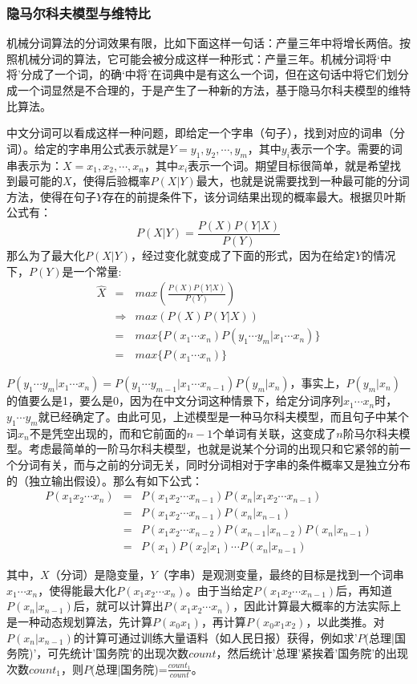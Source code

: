 \subsubsection{隐马尔科夫模型与维特比}
\par 机械分词算法的分词效果有限，比如下面这样一句话：产量三年中将增长两倍。按照机械分词的算法，它可能会被分成这样一种形式：产量\textbar 三年。机械分词将‘中将’分成了一个词，的确‘中将’在词典中是有这么一个词，但在这句话中将它们划分成一个词显然是不合理的，于是产生了一种新的方法，基于隐马尔科夫模型的维特比算法。
\par 中文分词可以看成这样一种问题，即给定一个字串（句子），找到对应的词串（分词）。给定的字串用公式表示就是$Y= y_1,y_2,\cdots,y_m$，其中$y_i$表示一个字。需要的词串表示为：$X=x_1,x_2,\cdots,x_n$，其中$x_i$表示一个词。期望目标很简单，就是希望找到最可能的$X$，使得后验概率$P(X|Y)$最大，也就是说需要找到一种最可能的分词方法，使得在句子$Y$存在的前提条件下，该分词结果出现的概率最大。根据贝叶斯公式有：
$$P(X|Y) = \frac{P(X)P(Y|X)}{P(Y)}$$
那么为了最大化$P(X|Y)$，经过变化就变成了下面的形式，因为在给定$Y$的情况下，$P(Y)$是一个常量:
\begin{eqnarray}
\hat{X} &=& max(\frac{P(X)P(Y|X)}{P(Y)}) \\
 &\Longrightarrow& max(P(X)P(Y|X)) \\
 &=& max\{P(x_1\cdots x_n)P(y_1\cdots y_m|x_1\cdots x_n)\}\\
 &=& max\{P(x_1\cdots x_n)\}   
\end{eqnarray}
\par $P(y_1\cdots y_m|x_1\cdots x_n)=P(y_1\cdots y_{m-1}|x_1\cdots x_{n-1})P(y_m|x_n)$，事实上，$P(y_m|x_n)$的值要么是1，要么是0，因为在中文分词这种情景下，给定分词序列$x_1\cdots x_n$时，$y_1\cdots y_m$就已经确定了。由此可见，上述模型是一种马尔科夫模型，而且句子中某个词$x_n$不是凭空出现的，而和它前面的$n-1$个单词有关联，这变成了$n$阶马尔科夫模型。考虑最简单的一阶马尔科夫模型，也就是说某个分词的出现只和它紧邻的前一个分词有关，而与之前的分词无关，同时分词相对于字串的条件概率又是独立分布的（独立输出假设）。那么有如下公式：
\begin{eqnarray}
P(x_1x_2\cdots x_n)&=&P(x_1x_2\cdots x_{n-1})P(x_n|x_1x_2\cdots x_{n-1})\\
&=&P(x_1x_2\cdots x_{n-1})P(x_n|x_{n-1})\\
&=&P(x_1x_2\cdots x_{n-2})P(x_{n-1}|x_{n-2})P(x_n|x_{n-1})\\
&=&P(x_1)P(x_2|x_1)\cdots P(x_n|x_{n-1})
\end{eqnarray}
\par 其中，$X$（分词）是隐变量，$Y$（字串）是观测变量，最终的目标是找到一个词串$x_1\cdots x_n$，使得能最大化$P(x_1x_2\cdots x_n)$。由于当给定$P(x_1x_2\cdots x_{n-1})$后，再知道$P(x_n|x_{n-1})$后，就可以计算出$P(x_1x_2\cdots x_n)$，因此计算最大概率的方法实际上是一种动态规划算法，先计算$P(x_0x_1)$，再计算$P(x_0x_1x_2)$，以此类推。对$P(x_n|x_{n-1})$的计算可通过训练大量语料（如人民日报）获得，例如求'$P$(总理|国务院)'，可先统计'国务院'的出现次数$count$，然后统计'总理'紧挨着'国务院'的出现次数$count_1$，则$P$(总理|国务院)=$\frac{count_1}{count}$。
